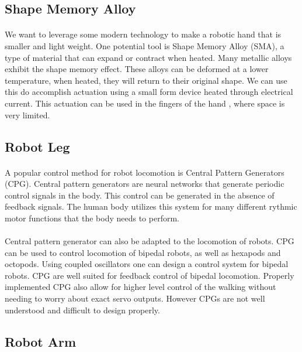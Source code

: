\documentclass[titlepage,letterpaper,12pt]{article}
\begin{document}
\subsection{Shape Memory Alloy}
\paragraph{}We want to leverage some modern technology to make a robotic hand
that is smaller and light weight. One potential tool is Shape Memory Alloy
(SMA), a type of material that can expand or contract when
heated\cite{Schetky1982}. Many metallic alloys exhibit the shape memory
effect\cite{Wayman1993}. These alloys can be deformed at a lower temperature,
when heated, they will return to their original shape. We can use this do
accomplish actuation using a small form device heated through electrical
current\cite{Ikuta1990}. This actuation can be used in the fingers of the hand
, where space is very limited.

\subsection{Robot Leg}
\paragraph{}A popular control method for robot locomotion is Central Pattern
Generators (CPG). Central pattern generators are neural networks that generate
periodic control signals in the body. This control can be generated in the
absence of feedback signals. The human body utilizes this
system for many different rythmic motor functions that the body needs to
perform\cite{cpggeneral}. 

\paragraph{}Central pattern generator can also be adapted to the locomotion of
robots. CPG can be used to control locomotion of bipedal robots, as well as
hexapods and octopods. Using coupled oscillators one can design a control system
for bipedal robots. CPG are well suited for feedback control of bipedal
locomotion. Properly implemented CPG also allow for higher level control of the
walking without needing to worry about exact servo outputs. However CPGs are not
well understood and difficult to design properly\cite{Ijspeert2008}.

\subsection{Robot Arm}
\end{document}
